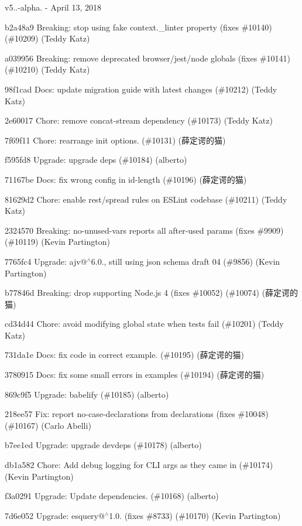 v5..-\/alpha. -\/ April 13, 2018


\begin{DoxyItemize}
\item b2a48a9 Breaking\+: stop using fake {\ttfamily context.\+\_\+linter} property (fixes \#10140) (\#10209) (Teddy Katz)
\item a039956 Breaking\+: remove deprecated browser/jest/node globals (fixes \#10141) (\#10210) (Teddy Katz)
\item 98f1cad Docs\+: update migration guide with latest changes (\#10212) (Teddy Katz)
\item 2e60017 Chore\+: remove concat-\/stream dependency (\#10173) (Teddy Katz)
\item 7f69f11 Chore\+: rearrange init options. (\#10131) (薛定谔的猫)
\item f595fd8 Upgrade\+: upgrade deps (\#10184) (alberto)
\item 71167be Docs\+: fix wrong config in id-\/length (\#10196) (薛定谔的猫)
\item 81629d2 Chore\+: enable rest/spread rules on ESLint codebase (\#10211) (Teddy Katz)
\item 2324570 Breaking\+: no-\/unused-\/vars reports all after-\/used params (fixes \#9909) (\#10119) (Kevin Partington)
\item 7765fc4 Upgrade\+: ajv@\texorpdfstring{$^\wedge$}{\string^}6.0., still using json schema draft 04 (\#9856) (Kevin Partington)
\item b77846d Breaking\+: drop supporting Node.\+js 4 (fixes \#10052) (\#10074) (薛定谔的猫)
\item cd34d44 Chore\+: avoid modifying global state when tests fail (\#10201) (Teddy Katz)
\item 731da1e Docs\+: fix code in correct example. (\#10195) (薛定谔的猫)
\item 3780915 Docs\+: fix some small errors in examples (\#10194) (薛定谔的猫)
\item 869c9f5 Upgrade\+: babelify (\#10185) (alberto)
\item 218ee57 Fix\+: report no-\/case-\/declarations from declarations (fixes \#10048) (\#10167) (Carlo Abelli)
\item b7ee1ed Upgrade\+: upgrade devdeps (\#10178) (alberto)
\item db1a582 Chore\+: Add debug logging for CLI args as they came in (\#10174) (Kevin Partington)
\item f3a0291 Upgrade\+: Update dependencies. (\#10168) (alberto)
\item 7d6e052 Upgrade\+: esquery@\texorpdfstring{$^\wedge$}{\string^}1.0. (fixes \#8733) (\#10170) (Kevin Partington)

\end{DoxyItemize}
